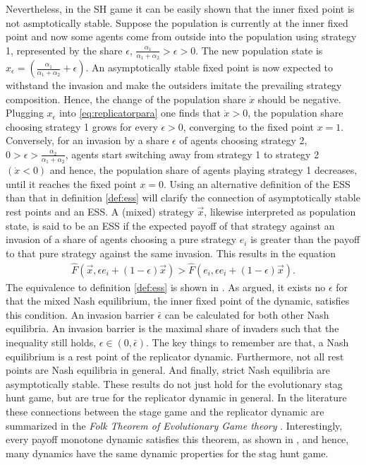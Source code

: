 Nevertheless, in the SH game it can be easily shown that the inner
fixed point is not asmptotically stable.
Suppose the population is currently at the inner fixed point and now 
some agents come from outside into the population
using strategy 1, represented by the share $\epsilon$,
$\frac{\alpha_1}{\alpha_1+\alpha_2}>\epsilon > 0$.
The new population state is 
$x_{\epsilon}=\left(\frac{\alpha_1}{\alpha_1+\alpha_2} + \epsilon\right)$.
An asymptotically stable fixed point is now expected to withstand the invasion
and make the outsiders imitate the prevailing strategy composition. Hence, 
the change of the population share $\dot{x}$ should be negative.
Plugging $x_{\epsilon}$ into
\eqref{eq:replicatorpara} one finds that $\dot{x} >0$, the population share
choosing strategy 1 grows for every $\epsilon >0$, converging to the 
fixed point $x = 1$. Conversely, for an invasion by a share $\epsilon$ 
of agents
choosing strategy 2, $0 > \epsilon > \frac{\alpha_2}{\alpha_1+\alpha_2}$,
agents start switching away from strategy 1 to strategy 2 $(\dot{x} < 0)$ 
and hence, the population share of agents playing strategy 1 
decreases, until it reaches the 
fixed point $x=0$. 
Using an alternative definition of the ESS than that in definition 
\ref{def:ess} will clarify the connection of asymptotically stable rest 
points and an ESS.
A (mixed) strategy $\vec{x}$, likewise 
interpreted as population state, is said to be an ESS if the 
expected payoff of that strategy against an invasion of a share of agents
choosing a pure strategy $e_i$ is greater than the payoff to that
pure strategy against the same invasion.
This results in the equation 
\begin{align*}
\hat{F}(\vec{x},\epsilon e_i + (1-\epsilon) \vec{x}) >
\hat{F}(e_i,\epsilon e_i + (1-\epsilon) \vec{x}).
\end{align*}
The equivalence to definition \eqref{def:ess} is shown in 
\textcite[37]{weibull_evolutionary_1997}.
As argued, it exists no $\epsilon$ for that the mixed Nash equilibrium, 
the inner fixed point of the dynamic, satisfies this condition. 
An invasion barrier $\bar{\epsilon}$ can be calculated for both other
Nash equilibria.
An invasion barrier is the maximal share of invaders 
such that the inequality still holds, $\epsilon \in (0,\bar{\epsilon})$.
The key things to remember are that, a Nash equilibrium is a rest point of
the replicator dynamic. Furthermore, not all rest points are 
Nash equilibria in general. And finally, strict Nash equilibria 
are asymptotically stable. These results do not just hold for
the evolutionary stag hunt game, but are true for the replicator dynamic
in general. In the literature these connections between the stage game
and the replicator dynamic are summarized in the
\textit{Folk Theorem of Evolutionary Game theory} 
\parencite[25]{szabo_evolutionary_2007}. Interestingly, every payoff
monotone dynamic satisfies this theorem, as shown in 
\textcite{hofbauer_evolutionary_2003}, and hence, many dynamics have the same
dynamic properties for the stag hunt game. 

